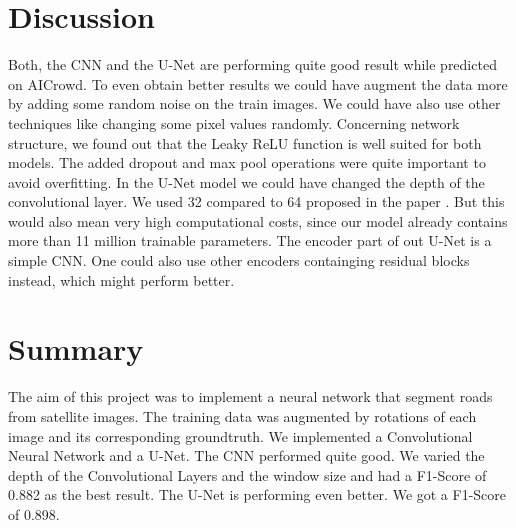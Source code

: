 \documentclass[10pt,conference,compsocconf]{IEEEtran}
\begin{document}
\vspace{0.5cm}
\section{Discussion}
\vspace{0.3cm}
Both, the CNN and the U-Net are performing quite good result while predicted on AICrowd. To even obtain better results we could have augment the data more by adding some random noise on the train images. We could have also use other techniques like changing some pixel values randomly. 
Concerning network structure, we found out that the Leaky ReLU function is well suited for both models. The added dropout and max pool operations were quite important to avoid overfitting. In the U-Net model we could have changed the depth of the convolutional layer. We used 32 compared to 64 proposed in the paper \cite{unet}. But this would also mean very high computational costs, since our model already contains more than 11 million trainable parameters. The encoder part of out U-Net is a simple CNN. One could also use other encoders containging residual blocks instead, which might perform better.

\vspace{0.5cm}
\section{Summary}
\vspace{0.3cm}
The aim of this project was to implement a neural network that segment roads from satellite images. The training data was augmented by rotations of each image and its corresponding groundtruth. We implemented a Convolutional Neural Network and a U-Net. The CNN performed quite good. We varied the depth of the Convolutional Layers and the window size and had a F1-Score of 0.882 as the best result. The U-Net is performing even better. We got a F1-Score of 0.898.  




\vspace{1cm}


\end{document}
